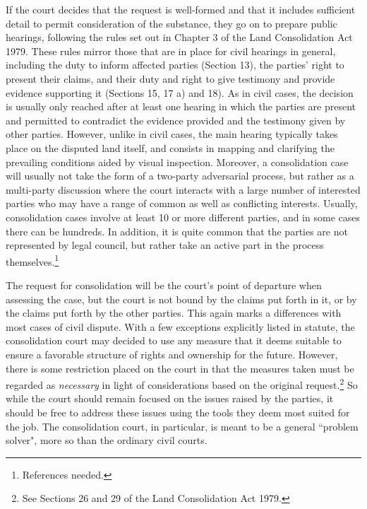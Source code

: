 \documentclass[10pt]{article} %
\begin{document}
If the court decides that the request is well-formed and that it includes sufficient detail to permit consideration of the substance, they go on to prepare public hearings, following the rules set out in Chapter 3 of the Land Consolidation Act 1979. These rules mirror those that are in place for civil hearings in general, including the duty to inform affected parties (Section 13), the parties' right to present their claims, and their duty and right to give testimony and provide evidence supporting it (Sections 15, 17 a) and 18). As in civil cases, the decision is usually only reached after at least one hearing in which the parties are present and permitted to contradict the evidence provided and the testimony given by other parties. However, unlike in civil cases, the main hearing typically takes place on the disputed land itself, and consists in mapping and clarifying the prevailing conditions aided by visual inspection. Moreover, a consolidation case will usually not take the form of a two-party adversarial process, but rather as a multi-party discussion where the court interacts with a large number of interested parties who may have a range of common as well as conflicting interests. Usually, consolidation cases involve at least 10 or more different parties, and in some cases there can be hundreds. In addition, it is quite common that the parties are not represented by legal council, but rather take an active part in the process themselves.\footnote{References needed.}

The request for consolidation will be the court's point of departure when assessing the case, but the court is not bound by the claims put forth in it, or by the claims put forth by the other parties. This again marks a differences with most cases of civil dispute. With a few exceptions explicitly listed in statute, the consolidation court may decided to use any measure that it deems suitable to ensure a favorable structure of rights and ownership for the future. However, there is some restriction placed on the court in that the measures taken must be regarded as \emph{necessary} in light of considerations based on the original request.\footnote{See Sections 26 and 29 of the Land Consolidation Act 1979.} So while the court should remain focused on the issues raised by the parties, it should be free to address these issues using the tools they deem most suited for the job. The consolidation court, in particular, is meant to be a general ``problem solver", more so than the ordinary civil courts.
\end{document}
